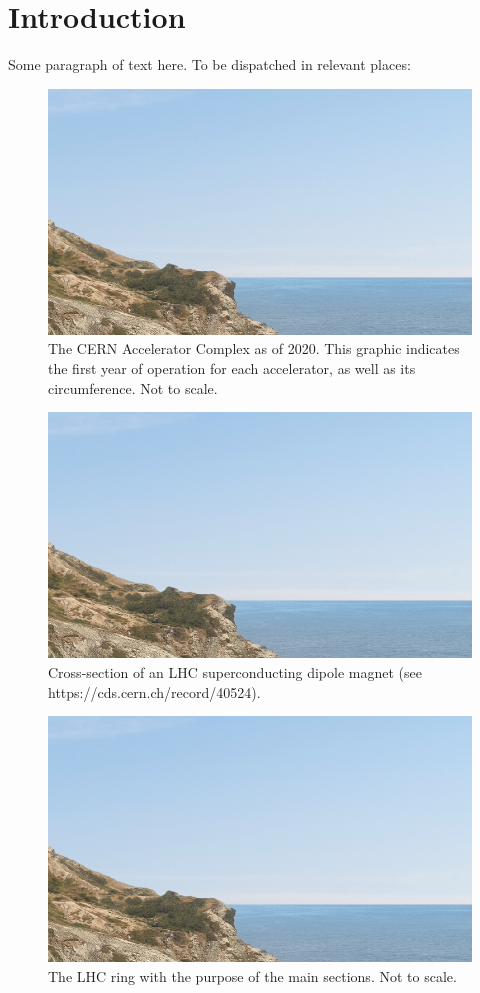 
\chapter{Introduction}

\label{Introduction} %


Some paragraph of text here.
To be dispatched in relevant places:

\begin{figure}[h]
  \centering
  \includegraphics*[width=0.5\linewidth]{Figures/placeholder.png}
  \caption{The CERN Accelerator Complex as of 2020. This graphic indicates the first year of operation for each accelerator, as well as its circumference. Not to scale.}
  \label{fig:cern_accelerator_complex}
\end{figure}


\begin{figure}[h]
  \centering
  \includegraphics*[width=0.5\linewidth]{Figures/placeholder.png}
  \caption{Cross-section of an LHC superconducting dipole magnet (see https://cds.cern.ch/record/40524).}
  \label{fig:lhc_dipole_crosssection}
\end{figure}


\begin{figure}[h]
  \centering
  \includegraphics*[width=0.5\linewidth]{Figures/placeholder.png}
  \caption{The LHC ring with the purpose of the main sections. Not to scale.}
  \label{fig:lhc_ring_sections}
\end{figure}

